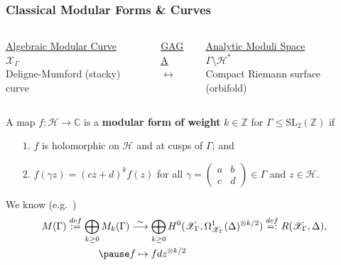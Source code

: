 \documentclass{beamer}
\numberwithin{equation}{section}
\numberwithin{case}{theorem}
\newcommand{\cH}{\mathcal{H}}		%
\newcommand{\sX}{\mathscr{X}}		%
\newcommand{\bbC}{\mathbb{C}}		%
\newcommand{\bbZ}{\mathbb{Z}}		%
\newcommand{\SL}{\mathrm{SL}} 	%
\newcommand{\<}{\left\langle}
\renewcommand{\>}{\right\rangle}
\begin{document}
	
\begin{frame}
	\frametitle{Classical Modular Forms \& Curves}
	\begin{columns}
		\begin{column}{.3\textwidth}
			\centering
			\underline{Algebraic Modular Curve}\\
			$\sX_{\Gamma}$\\
			Deligne-Mumford (stacky) curve
		\end{column}\pause
		\begin{column}{.3\textwidth}
			\centering
			\underline{GAGA}\\
			$\leftrightarrow$
		\end{column}\pause
		\begin{column}{.3\textwidth}
			\centering
			\underline{Analytic Moduli Space}\\
			$\Gamma\setminus\cH^*$\\
			Compact Riemann surface (orbifold)
		\end{column}
	\end{columns}\pause
	
	\begin{definition}
		A map $f:\cH\to \bbC$ is a \textbf{modular form of weight} $k\in \bbZ$ for $\Gamma\leq \SL_2(\bbZ)$ if \pause
		\begin{itemize}
			\item[$1.$] $f$ is holomorphic on $\cH$ and at cusps of $\Gamma$; and \pause
			\item[$2.$] $f(\gamma z)=(cz+d)^kf(z)$ for all $\gamma=\left(\begin{array}{cc}a&b\\c&d\end{array}\right)\in \Gamma$ and $z\in \cH.$
		\end{itemize}
	\end{definition}\pause
	We know (e.g.\ \cite[Chapter $6$]{VZB})
	\begin{align*}
	M(\Gamma)\overset{def}{:=}\bigoplus_{k\geq 0}M_k(\Gamma)&\overset{\sim}{\longrightarrow} \bigoplus_{k\geq 0} H^0(\sX_{\Gamma},\Omega^1_{\sX_{\Gamma}}(\Delta)^{\otimes k/2})\overset{def}{=:}R(\sX_{\Gamma},\Delta),\\\pause
	&f\mapsto fdz^{\otimes k/2}
	\end{align*}
\end{frame}	
	
\end{document}
